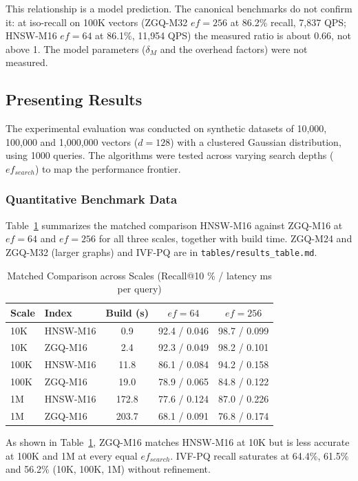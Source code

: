 \documentclass[conference]{IEEEtran}
\begin{document}
This relationship is a model prediction. The canonical benchmarks do not confirm it: at iso-recall on 100K vectors (ZGQ-M32 $ef=256$ at 86.2\% recall, 7,837 QPS; HNSW-M16 $ef=64$ at 86.1\%, 11,954 QPS) the measured ratio is about 0.66, not above 1. The model parameters ($\delta_M$ and the overhead factors) were not measured.

\subsection{Presenting Results}
The experimental evaluation was conducted on synthetic datasets of 10,000, 100,000 and 1,000,000 vectors ($d=128$) with a clustered Gaussian distribution, using 1000 queries. The algorithms were tested across varying search depths ($ef_{search}$) to map the performance frontier.

\subsubsection{Quantitative Benchmark Data}
Table~\ref{tab:scales} summarizes the matched comparison HNSW-M16 against ZGQ-M16 at $ef=64$ and $ef=256$ for all three scales, together with build time. ZGQ-M24 and ZGQ-M32 (larger graphs) and IVF-PQ are in \texttt{tables/results\_table.md}.

\begin{table}[htbp]
\caption{Matched Comparison across Scales (Recall@10 \% / latency ms per query)}
\label{tab:scales}
\centering
\begin{tabular}{llccc}
\toprule
\textbf{Scale} & \textbf{Index} & \textbf{Build (s)} & \textbf{$ef=64$} & \textbf{$ef=256$} \\
\midrule
10K & HNSW-M16 & 0.9 & 92.4 / 0.046 & 98.7 / 0.099 \\
10K & ZGQ-M16 & 2.4 & 92.3 / 0.049 & 98.2 / 0.101 \\
100K & HNSW-M16 & 11.8 & 86.1 / 0.084 & 94.2 / 0.158 \\
100K & ZGQ-M16 & 19.0 & 78.9 / 0.065 & 84.8 / 0.122 \\
1M & HNSW-M16 & 172.8 & 77.6 / 0.124 & 87.0 / 0.226 \\
1M & ZGQ-M16 & 203.7 & 68.1 / 0.091 & 76.8 / 0.174 \\
\bottomrule
\end{tabular}
\end{table}

As shown in Table~\ref{tab:scales}, ZGQ-M16 matches HNSW-M16 at 10K but is less accurate at 100K and 1M at every equal $ef_{search}$. IVF-PQ recall saturates at 64.4\%, 61.5\% and 56.2\% (10K, 100K, 1M) without refinement.
\end{document}
